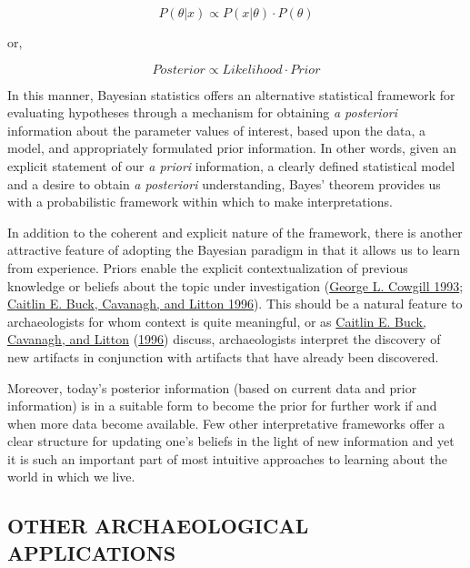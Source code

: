 \documentclass[
]{article}
\begin{document}
\begin{equation}     
P(\theta|x) \propto P(x| \theta) \cdot P(\theta)
\label{eg:6}
\end{equation}

or,

\begin{equation}
Posterior \propto Likelihood \cdot Prior
\label{eg:7}
\end{equation}

In this manner, Bayesian statistics offers an alternative statistical
framework for evaluating hypotheses through a mechanism for obtaining
\emph{a posteriori} information about the parameter values of interest,
based upon the data, a model, and appropriately formulated prior
information. In other words, given an explicit statement of our \emph{a
priori} information, a clearly defined statistical model and a desire to
obtain \emph{a posteriori} understanding, Bayes' theorem provides us
with a probabilistic framework within which to make interpretations.

In addition to the coherent and explicit nature of the framework, there
is another attractive feature of adopting the Bayesian paradigm in that
it allows us to learn from experience. Priors enable the explicit
contextualization of previous knowledge or beliefs about the topic under
investigation (\protect\hyperlink{ref-cowgill_distinguished_1993}{George
L. Cowgill 1993}; \protect\hyperlink{ref-buck_bayesian_1996}{Caitlin E.
Buck, Cavanagh, and Litton 1996}). This should be a natural feature to
archaeologists for whom context is quite meaningful, or as
\protect\hyperlink{ref-buck_bayesian_1996}{Caitlin E. Buck, Cavanagh,
and Litton} (\protect\hyperlink{ref-buck_bayesian_1996}{1996}) discuss,
archaeologists interpret the discovery of new artifacts in conjunction
with artifacts that have already been discovered.

Moreover, today's posterior information (based on current data and prior
information) is in a suitable form to become the prior for further work
if and when more data become available. Few other interpretative
frameworks offer a clear structure for updating one's beliefs in the
light of new information and yet it is such an important part of most
intuitive approaches to learning about the world in which we live.
\newpage

\hypertarget{other-archaeological-applications}{%
\subsection{\texorpdfstring{\hfil OTHER ARCHAEOLOGICAL
APPLICATIONS\hfil}{OTHER ARCHAEOLOGICAL APPLICATIONS}}\label{other-archaeological-applications}}
\end{document}
